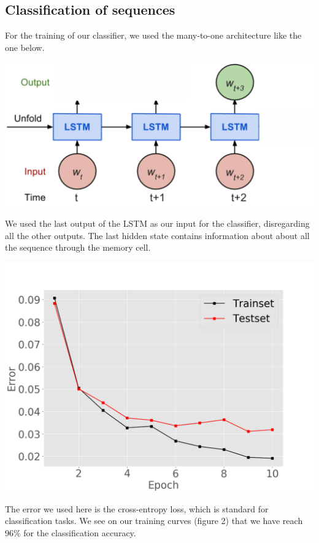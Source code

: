 \documentclass[landscape,a0paper,fontscale=0.34]{baposter}
\begin{document}
\begin{poster}
{\begin{multicols}{2}
\subsection*{Classification of sequences}
For the training of our classifier, we used the many-to-one architecture like the one below.
\begin{center}
	\includegraphics[width=.65\linewidth]{manytoone}
\end{center}
We used the last output of the LSTM as our input for the classifier,
disregarding all the other outputs. The last hidden state contains information
about about all the sequence through the memory cell.  \begin{center}
	\includegraphics[width=.7\linewidth]{classerror}
\end{center}
The error we used here is the cross-entropy loss, which is standard for
classification tasks. We see on our training curves (figure 2) that we have
reach 96\% for the classification accuracy.

\begin{center}

\end{center}
\end{multicols}}
\end{poster}
\end{document}
